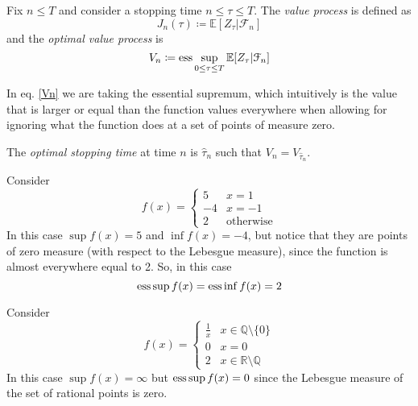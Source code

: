 \begin{definition}
Fix $n\le T$ and consider a stopping time $n\le\tau\le T$. The \emph{value process} is defined as
\begin{equation}
    J_n(\tau) \coloneqq \mathbb{E}[Z_{\tau}|\mathcal{F}_n]
\end{equation}
and the \emph{optimal value process} is
\begin{equation}\label{Vn}
    V_n \coloneqq \operatorname{ess}\sup_{0\le\tau\le T} \mathbb{E}[Z_{\tau}|\mathcal{F}_n]
\end{equation}
\end{definition}
\noindent In eq. \eqref{Vn} we are taking the essential supremum, which intuitively is the value that is larger or equal than the function values everywhere when allowing for ignoring what the function does at a set of points of measure zero.
\begin{definition}
The \emph{optimal stopping time} at time $n$ is $\hat{\tau}_n$ such that $V_n=V_{\hat{\tau}_n}$.
\end{definition}
\begin{example}{}{}
Consider
\begin{equation*}
    f(x)=\begin{cases}
    5 & x=1 \\
    -4 & x=-1 \\
    2 & \mbox{otherwise}
    \end{cases}
\end{equation*}
In this case $\sup f(x)=5$ and $\inf f(x)=-4$, but notice that they are points of zero measure (with respect to the Lebesgue measure), since the function is almost everywhere equal to 2. So, in this case
\begin{equation*}
    \operatorname{ess}\sup f(x) = \operatorname{ess}\inf f(x) = 2
\end{equation*}
\end{example}
\begin{example}{}{}
Consider
\begin{equation*}
    f(x)=\begin{cases}
    \frac{1}{x} & x\in\mathbb{Q}\setminus\{0\} \\
    0 & x=0 \\
    2 & x\in\mathbb{R}\setminus\mathbb{Q}
    \end{cases}
\end{equation*}
In this case $\sup f(x)=\infty$ but $\operatorname{ess}\sup f(x)=0$ since the Lebesgue measure of the set of rational points is zero.
\end{example}
